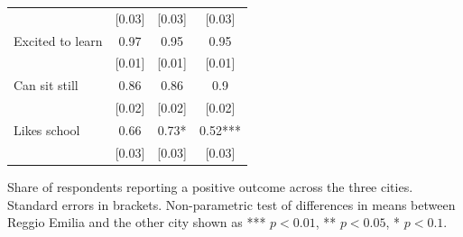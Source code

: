 \documentclass[12pt]{article}
\begin{document}
\begin{table}[ht]
\begin{center}
\begin{tabular}{lccc}
          & [0.03] & [0.03] & [0.03] \\
    Excited to learn & 0.97  & 0.95  & 0.95 \\
          & [0.01] & [0.01] & [0.01] \\
    Can sit still & 0.86  & 0.86  & 0.9 \\
          & [0.02] & [0.02] & [0.02] \\
    Likes school & 0.66  & 0.73* & 0.52*** \\
          & [0.03] & [0.03] & [0.03] \\


    \hline	
    \end{tabular}
\end{center}

\begin{footnotesize}
\raggedright{Share of respondents reporting a positive outcome across the three cities. Standard errors in brackets.
Non-parametric test of differences in means between Reggio Emilia and the other city shown as *** $p<0.01$, ** $p<0.05$, * $p<0.1$.}
\end{footnotesize}
\end{table}
\end{document}
